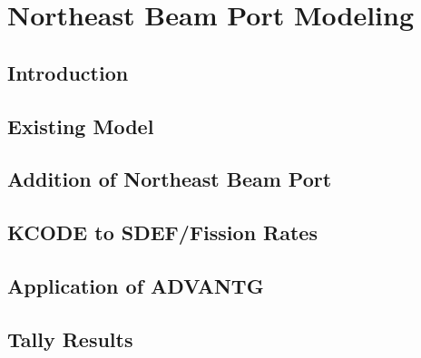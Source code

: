 
\cleardoublepage


\chapter{Northeast Beam Port Modeling}


\section{Introduction}
\section{Existing Model}
\section{Addition of Northeast Beam Port}
\section{KCODE to SDEF/Fission Rates}
\section{Application of ADVANTG}
\section{Tally Results}

